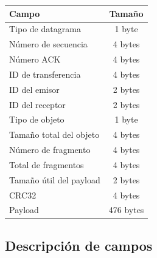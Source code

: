 \documentclass[12pt]{article}
\begin{document}
\begin{table}[h]
\centering
\begin{tabular}{|l|c|}
\hline
Campo & Tamaño \\
\hline
Tipo de datagrama & 1 byte \\
\hline
Número de secuencia & 4 bytes \\
\hline
Número ACK & 4 bytes \\
\hline
ID de transferencia & 4 bytes \\
\hline
ID del emisor & 2 bytes \\
\hline
ID del receptor & 2 bytes \\
\hline
Tipo de objeto & 1 byte \\
\hline
Tamaño total del objeto & 4 bytes \\
\hline
Número de fragmento & 4 bytes \\
\hline
Total de fragmentos & 4 bytes \\
\hline
Tamaño útil del payload & 2 bytes \\
\hline
CRC32 & 4 bytes \\
\hline
Payload & 476 bytes \\
\hline
\end{tabular}
\end{table}

\subsection{Descripción de campos}
\end{document}
